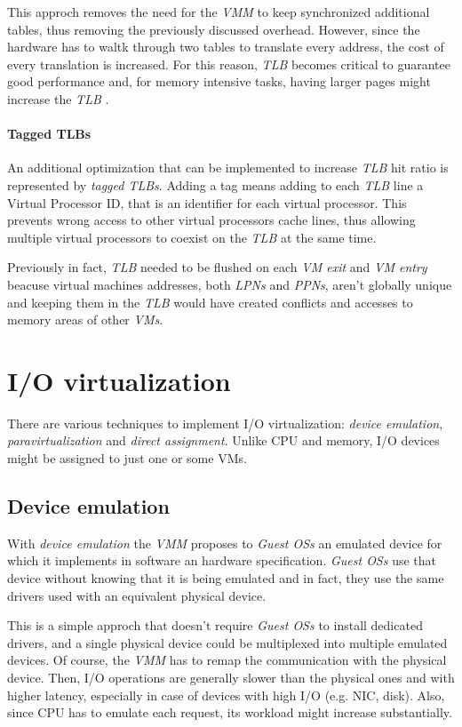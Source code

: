 \noindent
This approch removes the need for the \emph{VMM} to keep synchronized additional
tables, thus removing the previously discussed overhead. However, since the
hardware has to waltk through two tables to translate every address, the cost of
every translation is increased. For this reason, \emph{TLB} becomes critical to
guarantee good performance and, for memory intensive tasks, having larger pages
might increase the \emph{TLB} .

\paragraph{Tagged TLBs}
An additional optimization that can be implemented to increase \emph{TLB} hit
ratio is represented by \emph{tagged TLBs}. Adding a tag means adding to each
\emph{TLB} line a Virtual Processor ID, that is an identifier for each virtual
processor. This prevents wrong access to other virtual processors cache lines,
thus allowing multiple virtual processors to coexist on the \emph{TLB} at the
same time.

Previously in fact, \emph{TLB} needed to be flushed on each \emph{VM exit} and
\emph{VM entry} beacuse virtual machines addresses, both \emph{LPNs} and
\emph{PPNs}, aren't globally unique and keeping them in the \emph{TLB} would
have created conflicts and accesses to memory areas of other \emph{VMs}.

\section{I/O virtualization}
There are various techniques to implement I/O virtualization: \emph{device
emulation}, \emph{paravirtualization} and \emph{direct assignment}. Unlike CPU and
memory, I/O devices might be assigned to just one or some VMs.

\subsection{Device emulation}
With \emph{device emulation} the \emph{VMM} proposes to \emph{Guest OSs} an
emulated device for which it implements in software an hardware specification.
\emph{Guest OSs} use that device without knowing that it is being emulated and
in fact, they use the same drivers used with an equivalent physical device.

This is a simple approch that doesn't require \emph{Guest OSs} to install
dedicated drivers, and a single physical device could be multiplexed into
multiple emulated devices. Of course, the \emph{VMM} has to remap the communication
with the physical device. Then, I/O operations are generally slower than the
physical ones and with higher latency, especially in case of devices with high
I/O (e.g. NIC, disk). Also, since CPU has to emulate each request, its workload
might increase substantially.

